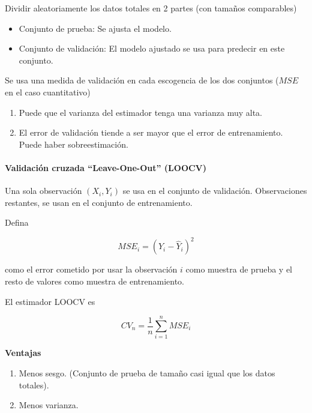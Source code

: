 \documentclass[
  12pt,
]{book}
\providecommand{\tightlist}{%
  \setlength{\itemsep}{0pt}\setlength{\parskip}{0pt}}
\theoremstyle{definition}
\theoremstyle{definition}
\theoremstyle{definition}
\theoremstyle{remark}
\begin{document}
Dividir aleatoriamente los datos totales en 2 partes (con tamaños comparables)

\begin{itemize}
\tightlist
\item
  Conjunto de prueba: Se ajusta el modelo.
\item
  Conjunto de validación: El modelo ajustado se usa para predecir en este conjunto.
\end{itemize}

Se usa una medida de validación en cada escogencia de los dos conjuntos (\(MSE\) en el caso cuantitativo)

\begin{enumerate}
\def\labelenumi{\arabic{enumi}.}
\tightlist
\item
  Puede que el varianza del estimador tenga una varianza muy alta.
\item
  El error de validación tiende a ser mayor que el error de entrenamiento. Puede haber sobreestimación.
\end{enumerate}

\hypertarget{validaciuxf3n-cruzada-leave-one-out-loocv}{%
\paragraph{\texorpdfstring{Validación cruzada \enquote{Leave-One-Out} (LOOCV)}{Validación cruzada ``Leave-One-Out'' (LOOCV)}}\label{validaciuxf3n-cruzada-leave-one-out-loocv}}

Una sola observación \(\left( X_{i}, Y_{i} \right)\) se usa en el conjunto de validación. Observaciones restantes, se usan en el conjunto de entrenamiento.

Defina

\begin{equation*}
MSE_{i} =(Y_{i}-\hat{Y}_{i})^{2}
\end{equation*}

como el error cometido por usar la observación \(i\) como muestra de prueba y el resto de valores como muestra de entrenamiento.

El estimador LOOCV es

\begin{equation*}
CV_{n} = \frac{1}{n} \sum_{i=1}^{n} MSE_{i}
\end{equation*}

\textbf{Ventajas}

\begin{enumerate}
\def\labelenumi{\arabic{enumi}.}
\tightlist
\item
  Menos sesgo. (Conjunto de prueba de tamaño casi igual que los datos totales).
\item
  Menos varianza.
\end{enumerate}
\end{document}
